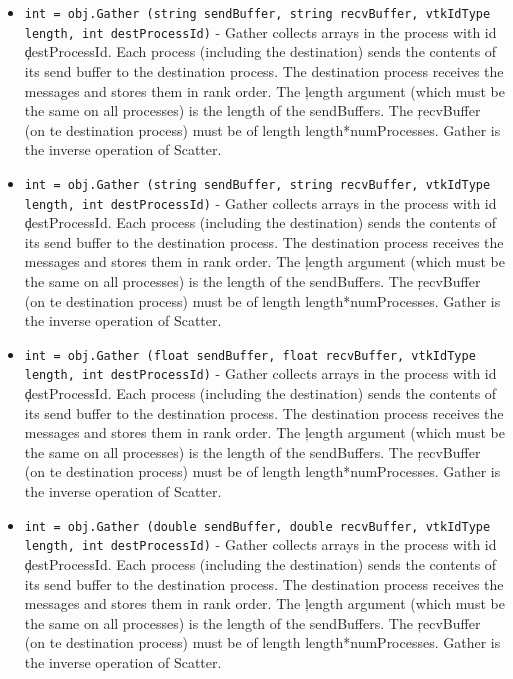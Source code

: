 \begin{itemize}
\item  \verb|int = obj.Gather (string sendBuffer, string recvBuffer, vtkIdType length, int destProcessId)| -  Gather collects arrays in the process with id \c destProcessId.  Each
 process (including the destination) sends the contents of its send buffer
 to the destination process.  The destination process receives the
 messages and stores them in rank order.  The \c length argument
 (which must be the same on all processes) is the length of the
 sendBuffers.  The \c recvBuffer (on te destination process) must be of
 length length*numProcesses.  Gather is the inverse operation of Scatter.

\item  \verb|int = obj.Gather (string sendBuffer, string recvBuffer, vtkIdType length, int destProcessId)| -  Gather collects arrays in the process with id \c destProcessId.  Each
 process (including the destination) sends the contents of its send buffer
 to the destination process.  The destination process receives the
 messages and stores them in rank order.  The \c length argument
 (which must be the same on all processes) is the length of the
 sendBuffers.  The \c recvBuffer (on te destination process) must be of
 length length*numProcesses.  Gather is the inverse operation of Scatter.

\item  \verb|int = obj.Gather (float sendBuffer, float recvBuffer, vtkIdType length, int destProcessId)| -  Gather collects arrays in the process with id \c destProcessId.  Each
 process (including the destination) sends the contents of its send buffer
 to the destination process.  The destination process receives the
 messages and stores them in rank order.  The \c length argument
 (which must be the same on all processes) is the length of the
 sendBuffers.  The \c recvBuffer (on te destination process) must be of
 length length*numProcesses.  Gather is the inverse operation of Scatter.

\item  \verb|int = obj.Gather (double sendBuffer, double recvBuffer, vtkIdType length, int destProcessId)| -  Gather collects arrays in the process with id \c destProcessId.  Each
 process (including the destination) sends the contents of its send buffer
 to the destination process.  The destination process receives the
 messages and stores them in rank order.  The \c length argument
 (which must be the same on all processes) is the length of the
 sendBuffers.  The \c recvBuffer (on te destination process) must be of
 length length*numProcesses.  Gather is the inverse operation of Scatter.


\end{itemize}

